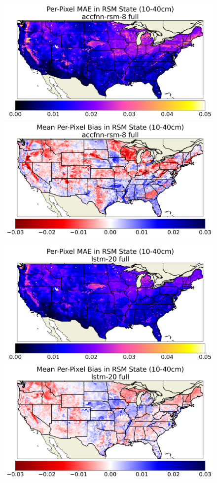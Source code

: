 \begin{figure}[hp!]
    \centering

    \includegraphics[width=.48\linewidth,draft=false]{figures/grid-eval_best_full/eval-grid_full_accfnn-rsm-8_rsm-40_spatial-stats_abs-err_state-err-abs-mean.png}
    \includegraphics[width=.48\linewidth,draft=false]{figures/grid-eval_best_full/eval-grid_full_accfnn-rsm-8_rsm-40_spatial-stats_bias_state-err-bias-mean.png}

    \includegraphics[width=.48\linewidth,draft=false]{figures/grid-eval_best_full/eval-grid_full_lstm-20_rsm-40_spatial-stats_abs-err_state-err-abs-mean.png}
    \includegraphics[width=.48\linewidth,draft=false]{figures/grid-eval_best_full/eval-grid_full_lstm-20_rsm-40_spatial-stats_bias_state-err-bias-mean.png}


\end{figure}
